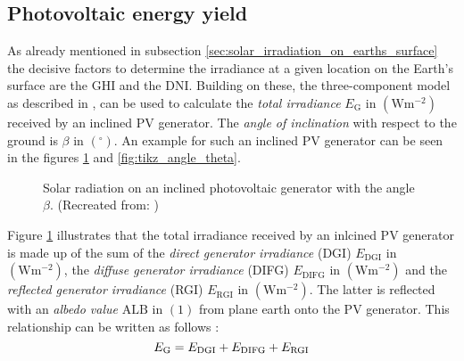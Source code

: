 \subsection{Photovoltaic energy yield} \label{sec:energy_yield}
As already mentioned in subsection \ref{sec:solar_irradiation_on_earths_surface} the decisive factors to determine the irradiance at a given location on the Earth's surface are the GHI and the DNI. Building on these, the three-component model as described in \cite{Landis:1995, Mertens:2015}, can be used to calculate the \emph{total irradiance} $E_{\mathrm{G}}$ in $\left( \mathrm{W}\mathrm{m}^{-2} \right)$ received by an inclined PV generator. The \emph{angle of inclination} with respect to the ground is $\beta$ in $\left( ^\circ \right)$. An example for such an inclined PV generator can be seen in the figures \ref{fig:tikz_three_component_model} and \ref{fig:tikz_angle_theta}.
\begin{figure}[h!]
	\centering
	
	\caption{Solar radiation on an inclined photovoltaic generator with the angle $\beta$. (Recreated from: \cite{Mertens:2015})}
	\label{fig:tikz_three_component_model}
\end{figure}
Figure \ref{fig:tikz_three_component_model} illustrates that the total irradiance received by an inlcined PV generator is made up of the sum of the \emph{direct generator irradiance} (DGI) $E_{\mathrm{DGI}}$ in $\left( \mathrm{W}\mathrm{m}^{-2} \right)$, the \emph{diffuse generator irradiance} (DIFG) $E_{\mathrm{DIFG}}$ in $\left( \mathrm{W}\mathrm{m}^{-2} \right)$ and the \emph{reflected generator irradiance} (RGI) $E_{\mathrm{RGI}}$ in $\left( \mathrm{W}\mathrm{m}^{-2} \right)$. The latter is reflected with an \emph{albedo value} $\mathrm{ALB}$ in $\left( 1 \right)$ from plane earth onto the PV generator. This relationship can be written as follows \cite{Bennett:2010, Bertol:2011, Mertens:2015, Bralower:2018}:
	\begin{equation} \label{eq:e_gen}
	\centering
		E_{\mathrm{G}} = E_{\mathrm{DGI}} + E_{\mathrm{DIFG}} + E_{\mathrm{RGI}}
	\end{equation}

